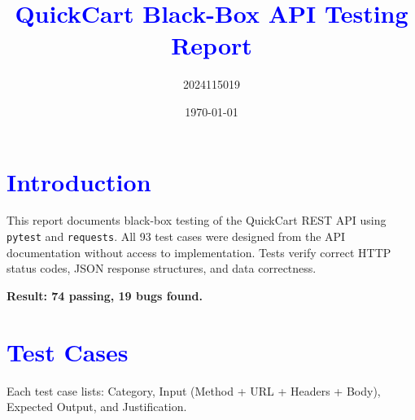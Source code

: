 \documentclass{article}
\title{\textcolor{blue}{QuickCart Black-Box API Testing Report}}
\author{2024115019}
\date{\today}
\begin{document}
\maketitle

\section*{\textcolor{blue}{Introduction}}
This report documents black-box testing of the QuickCart REST API using \texttt{pytest} and \texttt{requests}. All 93 test cases were designed from the API documentation without access to implementation. Tests verify correct HTTP status codes, JSON response structures, and data correctness.

\textbf{Result: 74 passing, 19 bugs found.}

\section*{\textcolor{blue}{Test Cases}}

Each test case lists: Category, Input (Method + URL + Headers + Body), Expected Output, and Justification.

\renewcommand{\labelitemi}{\textcolor{blue}{$\bullet$}}
\end{document}
